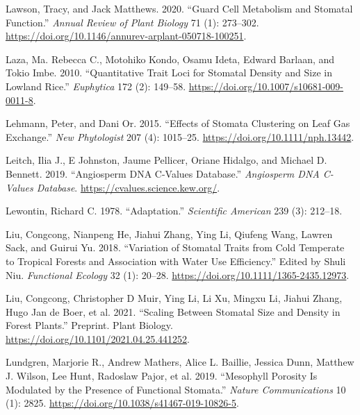 \documentclass[
  12pt,
]{article}
\newlength{\cslhangindent}
\newlength{\cslentryspacingunit} %
\newenvironment{CSLReferences}[2] %
 {%
  \setlength{\parindent}{0pt}
  \ifodd #1
  \let\oldpar\par
  \def\par{\hangindent=\cslhangindent\oldpar}
  \fi
  \setlength{\parskip}{#2\cslentryspacingunit}
 }%
 {}
\begin{document}
\begin{CSLReferences}{1}{0}
\leavevmode{}%
Lawson, Tracy, and Jack Matthews. 2020. {``Guard {Cell} {Metabolism} and {Stomatal} {Function}.''} \emph{Annual Review of Plant Biology} 71 (1): 273--302. \url{https://doi.org/10.1146/annurev-arplant-050718-100251}.

\leavevmode{}%
Laza, Ma. Rebecca C., Motohiko Kondo, Osamu Ideta, Edward Barlaan, and Tokio Imbe. 2010. {``Quantitative Trait Loci for Stomatal Density and Size in Lowland Rice.''} \emph{Euphytica} 172 (2): 149--58. \url{https://doi.org/10.1007/s10681-009-0011-8}.

\leavevmode{}%
Lehmann, Peter, and Dani Or. 2015. {``Effects of Stomata Clustering on Leaf Gas Exchange.''} \emph{New Phytologist} 207 (4): 1015--25. \url{https://doi.org/10.1111/nph.13442}.

\leavevmode{}%
Leitch, Ilia J., E Johnston, Jaume Pellicer, Oriane Hidalgo, and Michael D. Bennett. 2019. {``Angiosperm {DNA} {C}-Values Database.''} \emph{Angiosperm DNA C-Values Database}. \url{https://cvalues.science.kew.org/}.

\leavevmode{}%
Lewontin, Richard C. 1978. {``Adaptation.''} \emph{Scientific American} 239 (3): 212--18.

\leavevmode{}%
Liu, Congcong, Nianpeng He, Jiahui Zhang, Ying Li, Qiufeng Wang, Lawren Sack, and Guirui Yu. 2018. {``Variation of Stomatal Traits from Cold Temperate to Tropical Forests and Association with Water Use Efficiency.''} Edited by Shuli Niu. \emph{Functional Ecology} 32 (1): 20--28. \url{https://doi.org/10.1111/1365-2435.12973}.

\leavevmode{}%
Liu, Congcong, Christopher D Muir, Ying Li, Li Xu, Mingxu Li, Jiahui Zhang, Hugo Jan de Boer, et al. 2021. {``Scaling Between Stomatal Size and Density in Forest Plants.''} Preprint. Plant Biology. \url{https://doi.org/10.1101/2021.04.25.441252}.

\leavevmode{}%
Lundgren, Marjorie R., Andrew Mathers, Alice L. Baillie, Jessica Dunn, Matthew J. Wilson, Lee Hunt, Radoslaw Pajor, et al. 2019. {``Mesophyll Porosity Is Modulated by the Presence of Functional Stomata.''} \emph{Nature Communications} 10 (1): 2825. \url{https://doi.org/10.1038/s41467-019-10826-5}.


\end{CSLReferences}
\end{document}

